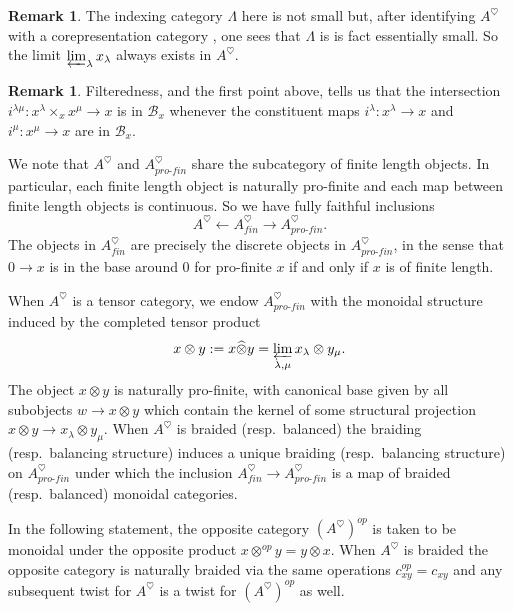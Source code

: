 \documentclass[reqno]{amsart}
\theoremstyle{definition}
\newtheorem{remark}[lemma]{Remark}
\newcommand{\mcl}[1]{\mathcal{#1}}
\newcommand{\ot}{\otimes}
\newcommand{\pf}{pro\text{-}fin}
\renewcommand{\1}{\mathbf{1}}
\renewcommand{\hat}{\widehat}
\begin{document}
\begin{remark}
The indexing category $\Lambda$ here is not small but, after identifying $A^{\heartsuit}$ with a corepresentation category \cite[Theorem 5.1]{takeuchi77}, one sees that $\Lambda$ is is fact essentially small.  So the limit $\varprojlim_{\lambda}x_{\lambda}$ always exists in $A^{\heartsuit}$.
\end{remark}

\begin{remark}
Filteredness, and the first point above, tells us that the intersection $i^{\lambda\mu}:x^{\lambda}\times_xx^{\mu}\to x$ is in $\mcl{B}_x$ whenever the constituent maps $i^{\lambda}:x^{\lambda}\to x$ and $i^{\mu}:x^{\mu}\to x$ are in $\mcl{B}_x$.
\end{remark}

We note that $A^{\heartsuit}$ and $A^{\heartsuit}_{\pf}$ share the subcategory of finite length objects.  In particular, each finite length object is naturally pro-finite and each map between finite length objects is continuous.  So we have fully faithful inclusions
\[
A^{\heartsuit}\leftarrow A^{\heartsuit}_{fin}\to A^{\heartsuit}_{\pf}.
\]
The objects in $A^{\heartsuit}_{fin}$ are precisely the discrete objects in $A^{\heartsuit}_{\pf}$, in the sense that $0\to x$ is in the base around $0$ for pro-finite $x$ if and only if $x$ is of finite length.
\par

When $A^{\heartsuit}$ is a tensor category, we endow $A^{\heartsuit}_{\pf}$ with the monoidal structure induced by the completed tensor product
\[
x\ot y:=x\hat{\ot}y=\varprojlim_{\lambda,\mu}x_{\lambda}\ot y_{\mu}.
\]
The object $x\ot y$ is naturally pro-finite, with canonical base given by all subobjects $w\to x\ot y$ which contain the kernel of some structural projection $x\ot y\to x_{\lambda}\ot y_{\mu}$.  When $A^{\heartsuit}$ is braided (resp.\ balanced) the braiding (resp.\ balancing structure) induces a unique braiding (resp.\ balancing structure) on $A^{\heartsuit}_{\pf}$ under which the inclusion $A^{\heartsuit}_{fin}\to A^{\heartsuit}_{\pf}$ is a map of braided (resp.\ balanced) monoidal categories.
\par

In the following statement, the opposite category $(A^{\heartsuit})^{op}$ is taken to be monoidal under the opposite product $x\ot^{op}y=y\ot x$. When $A^{\heartsuit}$ is braided the opposite category is naturally braided via the same operations $c^{op}_{xy}=c_{xy}$ and any subsequent twist for $A^{\heartsuit}$ is a twist for $(A^{\heartsuit})^{op}$ as well.
\end{document}
